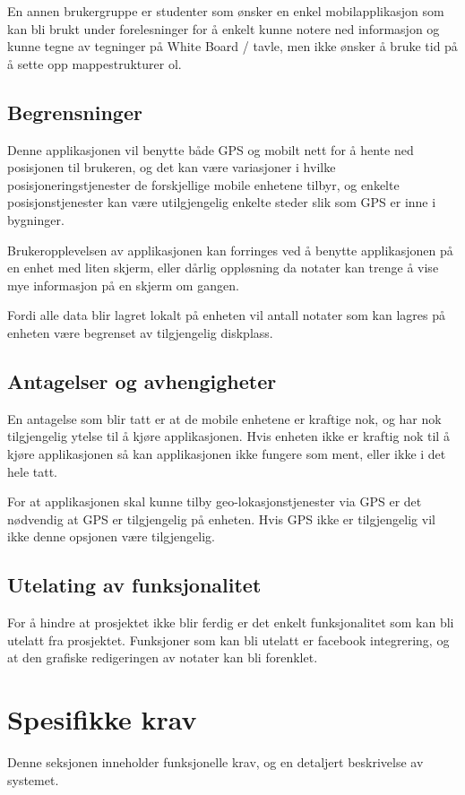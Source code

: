 \documentclass[a4paper, 12pt]{article}
\begin{document}
En annen brukergruppe er studenter som ønsker en enkel mobilapplikasjon som kan bli brukt under forelesninger for å enkelt kunne notere ned informasjon og kunne tegne av tegninger på White Board / tavle, men ikke ønsker å bruke tid på å sette opp mappestrukturer ol.

\subsection{Begrensninger}
Denne applikasjonen vil benytte både GPS og mobilt nett for å hente ned posisjonen til brukeren, og det kan være variasjoner i hvilke posisjoneringstjenester de forskjellige mobile enhetene tilbyr, og enkelte posisjonstjenester kan være utilgjengelig enkelte steder slik som GPS er inne i bygninger.

Brukeropplevelsen av applikasjonen kan forringes ved å benytte applikasjonen på en enhet med liten skjerm, eller dårlig oppløsning da notater kan trenge å vise mye informasjon på en skjerm om gangen.

Fordi alle data blir lagret lokalt på enheten vil antall notater som kan lagres på enheten være begrenset av tilgjengelig diskplass.

\subsection{Antagelser og avhengigheter}
En antagelse som blir tatt er at de mobile enhetene er kraftige nok, og har nok tilgjengelig ytelse til å kjøre applikasjonen. Hvis enheten ikke er kraftig nok til å kjøre applikasjonen så kan applikasjonen ikke fungere som ment, eller ikke i det hele tatt.

For at applikasjonen skal kunne tilby geo-lokasjonstjenester via GPS er det nødvendig at GPS er tilgjengelig på enheten. Hvis GPS ikke er tilgjengelig vil ikke denne opsjonen være tilgjengelig.

\subsection{Utelating av funksjonalitet}
For å hindre at prosjektet ikke blir ferdig er det enkelt funksjonalitet som kan bli utelatt fra prosjektet. Funksjoner som kan bli utelatt er facebook integrering, og at den grafiske redigeringen av notater kan bli forenklet.

\section{Spesifikke krav}
Denne seksjonen inneholder funksjonelle krav, og en detaljert beskrivelse av systemet.
\end{document}
